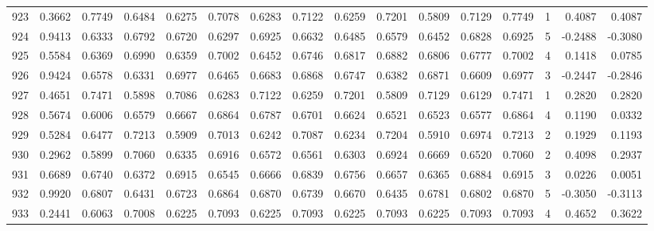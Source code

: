 \begin{tabular}{lrrrrrrrrrrrrrrr}
923 &      0.3662 &  0.7749 &  0.6484 &  0.6275 &  0.7078 &  0.6283 &  0.7122 &  0.6259 &  0.7201 &  0.5809 &   0.7129 &     0.7749 &      1 &                    0.4087 &                     0.4087 \\
924 &      0.9413 &  0.6333 &  0.6792 &  0.6720 &  0.6297 &  0.6925 &  0.6632 &  0.6485 &  0.6579 &  0.6452 &   0.6828 &     0.6925 &      5 &                   -0.2488 &                    -0.3080 \\
925 &      0.5584 &  0.6369 &  0.6990 &  0.6359 &  0.7002 &  0.6452 &  0.6746 &  0.6817 &  0.6882 &  0.6806 &   0.6777 &     0.7002 &      4 &                    0.1418 &                     0.0785 \\
926 &      0.9424 &  0.6578 &  0.6331 &  0.6977 &  0.6465 &  0.6683 &  0.6868 &  0.6747 &  0.6382 &  0.6871 &   0.6609 &     0.6977 &      3 &                   -0.2447 &                    -0.2846 \\
927 &      0.4651 &  0.7471 &  0.5898 &  0.7086 &  0.6283 &  0.7122 &  0.6259 &  0.7201 &  0.5809 &  0.7129 &   0.6129 &     0.7471 &      1 &                    0.2820 &                     0.2820 \\
928 &      0.5674 &  0.6006 &  0.6579 &  0.6667 &  0.6864 &  0.6787 &  0.6701 &  0.6624 &  0.6521 &  0.6523 &   0.6577 &     0.6864 &      4 &                    0.1190 &                     0.0332 \\
929 &      0.5284 &  0.6477 &  0.7213 &  0.5909 &  0.7013 &  0.6242 &  0.7087 &  0.6234 &  0.7204 &  0.5910 &   0.6974 &     0.7213 &      2 &                    0.1929 &                     0.1193 \\
930 &      0.2962 &  0.5899 &  0.7060 &  0.6335 &  0.6916 &  0.6572 &  0.6561 &  0.6303 &  0.6924 &  0.6669 &   0.6520 &     0.7060 &      2 &                    0.4098 &                     0.2937 \\
931 &      0.6689 &  0.6740 &  0.6372 &  0.6915 &  0.6545 &  0.6666 &  0.6839 &  0.6756 &  0.6657 &  0.6365 &   0.6884 &     0.6915 &      3 &                    0.0226 &                     0.0051 \\
932 &      0.9920 &  0.6807 &  0.6431 &  0.6723 &  0.6864 &  0.6870 &  0.6739 &  0.6670 &  0.6435 &  0.6781 &   0.6802 &     0.6870 &      5 &                   -0.3050 &                    -0.3113 \\
933 &      0.2441 &  0.6063 &  0.7008 &  0.6225 &  0.7093 &  0.6225 &  0.7093 &  0.6225 &  0.7093 &  0.6225 &   0.7093 &     0.7093 &      4 &                    0.4652 &                     0.3622 \\

\end{tabular}
